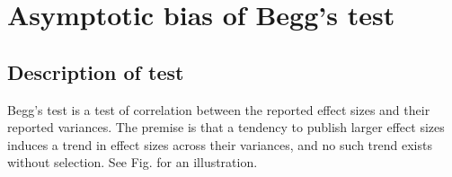 \documentclass[12pt]{article}
\begin{document}
  \section{Asymptotic bias of Begg's test}
  \label{section:theory}
\subsection{Description of test}
\label{section:theory:begg description}
    
    Begg's test is a test of correlation between the reported effect
    sizes and their reported variances. The premise is that a tendency
    to publish larger effect sizes induces a trend in effect sizes
    across their variances, and no such trend exists without
    selection. See Fig.  for an illustration.
    
\end{document}

